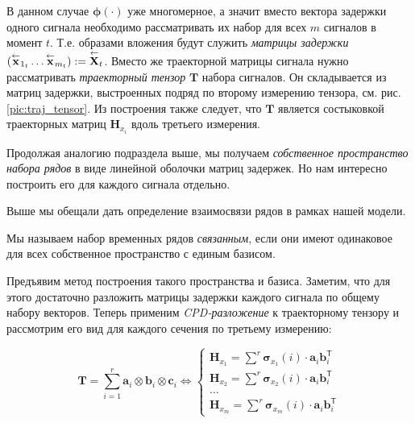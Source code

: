 	    	В данном случае $ \boldsymbol{\phi}(\cdot) $ уже многомерное, а значит вместо вектора задержки одного сигнала необходимо рассматривать их набор для всех $ m $ сигналов в момент $ t $. Т.е. образами вложения будут служить \emph{матрицы задержки} $ ( \overset{\leftarrow}{\mathbf{x}}_{1_t} \ldots \overset{\leftarrow}{\mathbf{x}}_{m_t} ) := \overset{\leftarrow}{\mathbf{X}}_{t} $. Вместо же траекторной матрицы сигнала нужно рассматривать \textit{траекторный тензор} $ \mathbf{T} $ набора сигналов. Он складывается из матриц задержки, выстроенных подряд по второму измерению тензора, см. рис.\ref{pic:traj_tensor}. Из построения также следует, что $ \mathbf{T} $ является состыковкой траекторных матриц $ \mathbf{H}_{x_i} $ вдоль третьего измерения.
	    	
	    	Продолжая аналогию подраздела выше, мы получаем \emph{собственное пространство набора рядов} в виде линейной оболочки матриц задержек. Но нам интересно построить его для каждого сигнала отдельно.
	    	
	    	Выше мы обещали дать определение взаимосвязи рядов в рамках нашей модели. 
	    	
	    	\begin{Def}
	    		Мы называем набор временных рядов \emph{связанным}, если они имеют одинаковое для всех собственное пространство с единым базисом.
	    	\end{Def}
	    	
	    	Предъявим метод построения такого пространства и базиса. Заметим, что для этого достаточно разложить матрицы задержки каждого сигнала по общему набору векторов. Теперь применим \textit{CPD-разложение} к траекторному тензору и рассмотрим его вид для каждого сечения по третьему измерению:
	    	
	    	\begin{equation}\label{eq:tSSA_decomp}
	    		\mathbf{T} = \sum\limits_{i = 1}^{r} \mathbf{a}_i \otimes \mathbf{b}_i \otimes \mathbf{c}_i \Leftrightarrow \begin{cases}
	    			\mathbf{H}_{x_1} = \sum\limits^{r} \boldsymbol{\sigma}_{x_1}(i) \cdot \mathbf{a}_i  \mathbf{b}_i^{\mathsf{T}}  \\
	    			\mathbf{H}_{x_2} = \sum\limits^{r} \boldsymbol{\sigma}_{x_2}(i) \cdot \mathbf{a}_i  \mathbf{b}_i^{\mathsf{T}} \\
	    			\ldots \\
	    			\mathbf{H}_{x_m} = \sum\limits^{r} \boldsymbol{\sigma}_{x_m}(i) \cdot \mathbf{a}_i  \mathbf{b}_i^{\mathsf{T}} 
	    		\end{cases}
	    	\end{equation}
	    
